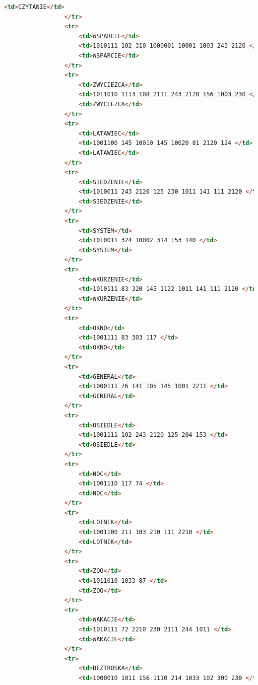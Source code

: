 \documentclass[12pt,a4paper]{article}
\begin{document}
\begin{itemize}
\begin{lstlisting}[language=Html]
                     <td>CZYTANIE</td> 
                 </tr>
                 <tr>
                     <td>WSPARCIE</td>
                     <td>1010111 102 310 1000001 10001 1003 243 2120 </td>
                     <td>WSPARCIE</td> 
                 </tr>
                 <tr>
                     <td>ZWYCIEZCA</td>
                     <td>1011010 1113 108 2111 243 2120 156 1003 230 </td>
                     <td>ZWYCIEZCA</td> 
                 </tr>
                 <tr>
                     <td>LATAWIEC</td>
                     <td>1001100 145 10010 145 10020 81 2120 124 </td>
                     <td>LATAWIEC</td> 
                 </tr>
                 <tr>
                     <td>SIEDZENIE</td>
                     <td>1010011 243 2120 125 230 1011 141 111 2120 </td>
                     <td>SIEDZENIE</td> 
                 </tr>
                 <tr>
                     <td>SYSTEM</td>
                     <td>1010011 324 10002 314 153 140 </td>
                     <td>SYSTEM</td> 
                 </tr>
                 <tr>
                     <td>WKURZENIE</td>
                     <td>1010111 83 320 145 1122 1011 141 111 2120 </td>
                     <td>WKURZENIE</td> 
                 </tr>
                 <tr>
                     <td>OKNO</td>
                     <td>1001111 83 303 117 </td>
                     <td>OKNO</td> 
                 </tr>
                 <tr>
                     <td>GENERAL</td>
                     <td>1000111 76 141 105 145 1001 2211 </td>
                     <td>GENERAL</td> 
                 </tr>
                 <tr>
                     <td>OSIEDLE</td>
                     <td>1001111 102 243 2120 125 204 153 </td>
                     <td>OSIEDLE</td> 
                 </tr>
                 <tr>
                     <td>NOC</td>
                     <td>1001110 117 74 </td>
                     <td>NOC</td> 
                 </tr>
                 <tr>
                     <td>LOTNIK</td>
                     <td>1001100 211 103 210 111 2210 </td>
                     <td>LOTNIK</td> 
                 </tr>
                 <tr>
                     <td>ZOO</td>
                     <td>1011010 1033 87 </td>
                     <td>ZOO</td> 
                 </tr>
                 <tr>
                     <td>WAKACJE</td>
                     <td>1010111 72 2210 230 2111 244 1011 </td>
                     <td>WAKACJE</td> 
                 </tr>
                 <tr>
                     <td>BEZTROSKA</td>
                     <td>1000010 1011 156 1110 214 1033 102 300 230 </td>

\end{lstlisting}
\end{itemize}
\end{document}
